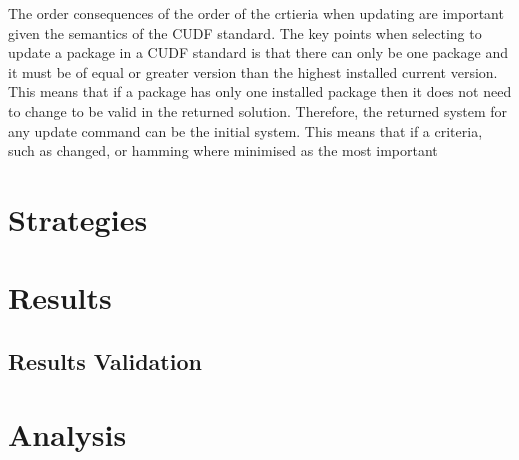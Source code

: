 The order consequences of the order of the crtieria when updating are important given the semantics of the CUDF standard.
The key points when selecting to update a package in a CUDF standard is that there can only be one package and it must be of equal or greater version than the highest installed current version.
This means that if a package has only one installed package then it does not need to change to be valid in the returned solution.
Therefore, the returned system for any update command can be the initial system.
This means that if a criteria, such as changed, or hamming where minimised as the most important  


\section{Strategies}

\section{Results}

\subsection{Results Validation}

\section{Analysis}

